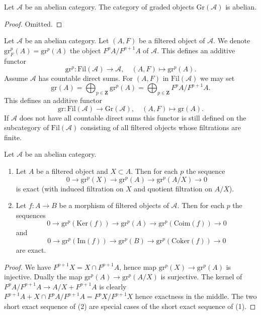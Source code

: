 \begin{lemma}
\label{lemma-graded}
Let $\mathcal{A}$ be an abelian category.
The category of graded objects $\text{Gr}(\mathcal{A})$
is abelian.
\end{lemma}

\begin{proof}
Omitted.
\end{proof}

\noindent
Let $\mathcal{A}$ be an abelian category. Let $(A, F)$ be a filtered
object of $\mathcal{A}$. We denote $\text{gr}^p_F(A) = \text{gr}^p(A)$
the object $F^pA/F^{p + 1}A$ of $\mathcal{A}$. This defines an
additive functor
$$
\text{gr}^p :
\text{Fil}(\mathcal{A})
\longrightarrow
\mathcal{A}, \quad
(A, F)
\longmapsto
\text{gr}^p(A).
$$
Assume $\mathcal{A}$ has countable direct sums.
For $(A, F)$ in $\text{Fil}(\mathcal{A})$ we may set
$$
\text{gr}(A) =
\bigoplus\nolimits_{p \in \mathbf{Z}} \text{gr}^p(A) =
\bigoplus\nolimits_{p \in \mathbf{Z}} F^pA/F^{p + 1}A.
$$
This defines an additive functor
$$
\text{gr} :
\text{Fil}(\mathcal{A})
\longrightarrow
\text{Gr}(\mathcal{A}), \quad
(A, F) \longmapsto \text{gr}(A).
$$
If $\mathcal{A}$ does not have all countable direct sums this functor
is still defined on the subcategory of $\text{Fil}(\mathcal{A})$ consisting
of all filtered objects whose filtrations are finite.

\begin{lemma}
\label{lemma-ses-gr}
Let $\mathcal{A}$ be an abelian category.
\begin{enumerate}
\item Let $A$ be a filtered object and $X \subset A$. Then for each $p$
the sequence
$$
0 \to \text{gr}^p(X) \to \text{gr}^p(A) \to \text{gr}^p(A/X) \to 0
$$
is exact (with induced filtration on $X$ and quotient filtration on $A/X$).
\item Let $f : A \to B$ be a morphism of filtered objects of $\mathcal{A}$.
Then for each $p$ the sequences
$$
0 \to \text{gr}^p(\text{Ker}(f)) \to \text{gr}^p(A) \to
\text{gr}^p(\text{Coim}(f)) \to 0
$$
and
$$
0 \to \text{gr}^p(\text{Im}(f)) \to \text{gr}^p(B) \to
\text{gr}^p(\text{Coker}(f)) \to 0
$$
are exact.
\end{enumerate}
\end{lemma}

\begin{proof}
We have $F^{p + 1}X = X \cap F^{p + 1}A$, hence map
$\text{gr}^p(X) \to \text{gr}^p(A)$ is injective. Dually the map
$\text{gr}^p(A) \to \text{gr}^p(A/X)$ is surjective.
The kernel of $F^pA/F^{p + 1}A \to A/X + F^{p + 1}A$
is clearly $F^{p + 1}A + X \cap F^pA/F^{p + 1}A = F^pX/F^{p + 1}X$
hence exactness in the middle.
The two short exact sequence of (2) are special cases of the
short exact sequence of (1).
\end{proof}

